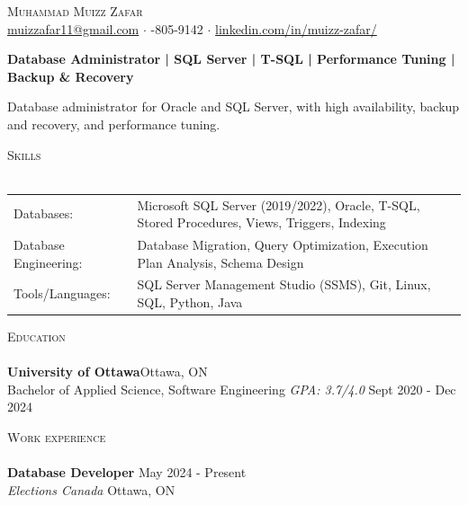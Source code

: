 \documentclass[a4paper]{article}
\newcommand{\lineunder} {
    \vspace*{-8pt} \\
    \hspace*{-18pt} \hrulefill \\
}
\newcommand{\header} [1] {
    {\hspace*{-18pt}\vspace*{6pt} \textsc{#1}}
    \vspace*{-6pt} \lineunder
}
\begin{document}
\vspace*{-40pt}
\vspace*{-10pt}
\begin{center}
	{\Huge \scshape {Muhammad Muizz Zafar}}\\
	\faSend \space \href{mailto:muizzafar11@gmail.com}{muizzafar11@gmail.com} $\cdot$ \faPhoneSquare {}-805-9142 $\cdot$ \faLinkedinSquare \space \href{https://www.linkedin.com/in/muizz-zafar/}{linkedin.com/in/muizz-zafar/}
	\\
\end{center}
\vspace{-5pt}
\begin{center}
\textbf{Database Administrator | SQL Server | T-SQL | Performance Tuning | Backup \& Recovery}
\end{center}
\begin{center}
Database administrator for Oracle and SQL Server, with high availability, backup and recovery, and performance tuning.
\end{center}
\header{Skills}
\begin{tabular}{ l l }
Databases: & Microsoft SQL Server (2019/2022), Oracle, T-SQL, Stored Procedures, Views, Triggers, Indexing \\
Database Engineering: & Database Migration, Query Optimization, Execution Plan Analysis, Schema Design \\
Tools/Languages: & SQL Server Management Studio (SSMS), Git, Linux, SQL, Python, Java \\
\end{tabular}
\vspace{2mm}
\header{Education}
\textbf{University of Ottawa}\hfill Ottawa, ON\\
Bachelor of Applied Science, Software Engineering \textit{GPA: 3.7/4.0} \hfill Sept 2020 - Dec 2024\\
\vspace{2mm}
\header{Work experience}
\vspace{1.5mm}
\textbf{Database Developer} \hfill May 2024 - Present\\
\textit{Elections Canada} \hfill Ottawa, ON\\
\vspace{-2mm}
\end{document}
